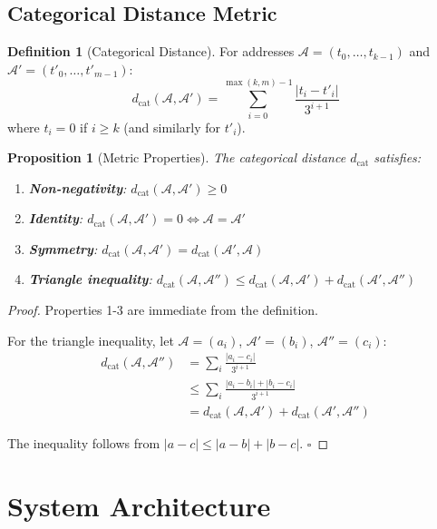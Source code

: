 \documentclass[twocolumn,10pt]{article}
\newtheorem{proposition}[theorem]{Proposition}
\theoremstyle{definition}
\newtheorem{definition}[theorem]{Definition}
\theoremstyle{remark}
\newcommand{\cataddr}{\mathcal{A}}
\newcommand{\dcat}{d_{\text{cat}}}
\begin{document}
\subsection{Categorical Distance Metric}

\begin{definition}[Categorical Distance]
For addresses $\cataddr = (t_0, \ldots, t_{k-1})$ and $\cataddr' = (t'_0, \ldots, t'_{m-1})$:
\begin{equation}
    \dcat(\cataddr, \cataddr') = \sum_{i=0}^{\max(k,m)-1} \frac{|t_i - t'_i|}{3^{i+1}}
\end{equation}
where $t_i = 0$ if $i \geq k$ (and similarly for $t'_i$).
\end{definition}

\begin{proposition}[Metric Properties]
The categorical distance $\dcat$ satisfies:
\begin{enumerate}
    \item \textbf{Non-negativity}: $\dcat(\cataddr, \cataddr') \geq 0$
    \item \textbf{Identity}: $\dcat(\cataddr, \cataddr') = 0 \iff \cataddr = \cataddr'$
    \item \textbf{Symmetry}: $\dcat(\cataddr, \cataddr') = \dcat(\cataddr', \cataddr)$
    \item \textbf{Triangle inequality}: $\dcat(\cataddr, \cataddr'') \leq \dcat(\cataddr, \cataddr') + \dcat(\cataddr', \cataddr'')$
\end{enumerate}
\end{proposition}

\begin{proof}
Properties 1-3 are immediate from the definition.

For the triangle inequality, let $\cataddr = (a_i)$, $\cataddr' = (b_i)$, $\cataddr'' = (c_i)$:
\begin{align}
    \dcat(\cataddr, \cataddr'') &= \sum_i \frac{|a_i - c_i|}{3^{i+1}} \\
    &\leq \sum_i \frac{|a_i - b_i| + |b_i - c_i|}{3^{i+1}} \\
    &= \dcat(\cataddr, \cataddr') + \dcat(\cataddr', \cataddr'')
\end{align}

The inequality follows from $|a - c| \leq |a - b| + |b - c|$. $\square$
\end{proof}

\section{System Architecture}
\label{sec:architecture}
\end{document}
